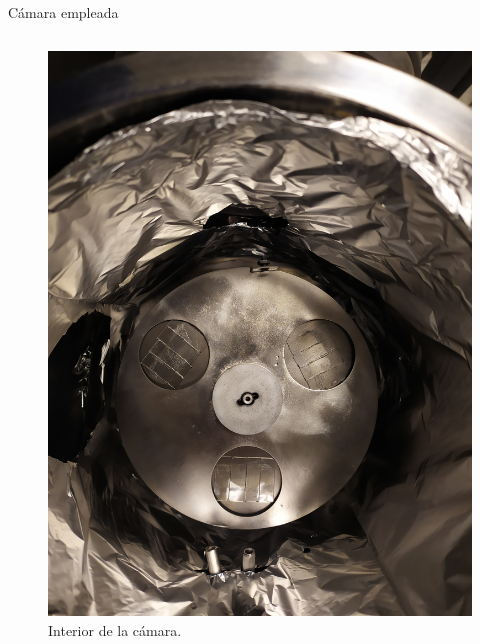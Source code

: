 \documentclass[11pt]{beamer}
\begin{document}
\begin{frame}{Cámara empleada}
\begin{columns}[T]
\begin{column}{.49\textwidth}
\begin{figure}[H]
					\includegraphics[scale=0.04]{img/muestras.jpg}
					\caption*{Interior de la cámara.}					
					\end{figure}
				\end{column}
			\end{columns}
		\end{frame}
	
\end{document}
